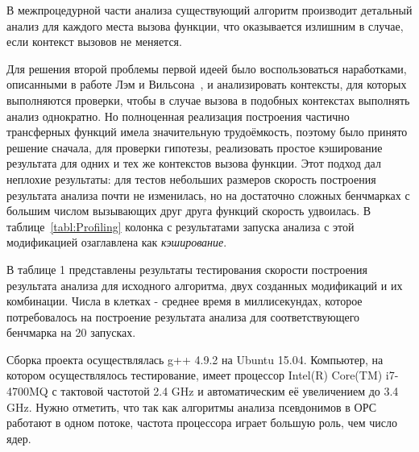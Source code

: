 В межпроцедурной части анализа существующий алгоритм производит детальный анализ для каждого места вызова функции, что оказывается излишним в случае, если контекст вызовов не меняется.

Для решения второй проблемы первой идеей было воспользоваться наработками, описанными в работе Лэм и Вильсона~\autocite{WilsonLamSIGPLAN95}, и анализировать контексты, для которых выполняются проверки, чтобы в случае вызова в подобных контекстах выполнять анализ однократно. Но полноценная реализация построения частично трансферных функций имела значительную трудоёмкость, поэтому было принято решение сначала, для проверки гипотезы, реализовать простое кэширование результата для одних и тех же контекстов вызова функции. Этот подход дал неплохие результаты: для тестов небольших размеров скорость построения результата анализа почти не изменилась, но на достаточно сложных бенчмарках с большим числом вызывающих друг друга функций скорость удвоилась. В таблице~\ref{tabl:Profiling} колонка с результатами запуска анализа с этой модификацией озаглавлена как \textit{кэширование}.

\Conc

В таблице 1 представлены результаты тестирования скорости построения результата анализа для исходного алгоритма, двух созданных модификаций и их комбинации. Числа в клетках - среднее время в миллисекундах, которое потребовалось на построение результата анализа для соответствующего бенчмарка на 20 запусках.

Сборка проекта осуществлялась g++ 4.9.2 на Ubuntu 15.04. Компьютер, на котором осуществлялось тестирование, имеет процессор Intel(R) Core(TM) i7-4700MQ с тактовой частотой 2.4 GHz и автоматическим её увеличением до 3.4 GHz. Нужно отметить, что так как алгоритмы анализа псевдонимов в ОРС работают в одном потоке, частота процессора играет большую роль, чем число ядер.


